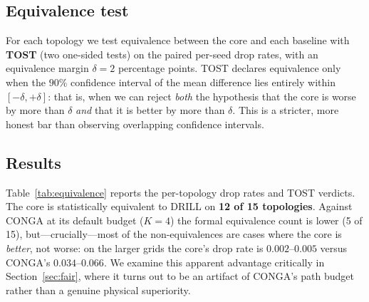 \subsection{Equivalence test}

For each topology we test equivalence between the core and each baseline with
\textbf{TOST} (two one-sided tests) on the paired per-seed drop rates, with an
equivalence margin $\delta = 2$ percentage points. TOST declares equivalence
only when the $90\%$ confidence interval of the mean difference lies entirely
within $[-\delta, +\delta]$: that is, when we can reject \emph{both} the
hypothesis that the core is worse by more than $\delta$ \emph{and} that it is
better by more than $\delta$. This is a stricter, more honest bar than
observing overlapping confidence intervals.

\subsection{Results}
\label{sec:equiv-results}

Table~\ref{tab:equivalence} reports the per-topology drop rates and TOST
verdicts. The core is statistically equivalent to DRILL on
\textbf{12 of 15 topologies}. Against CONGA at its default budget ($K=4$) the
formal equivalence count is lower (5 of 15), but---crucially---most of the
non-equivalences are cases where the core is \emph{better}, not worse: on the
larger grids the core's drop rate is $0.002$--$0.005$ versus CONGA's
$0.034$--$0.066$. We examine this apparent advantage critically in
Section~\ref{sec:fair}, where it turns out to be an artifact of CONGA's path
budget rather than a genuine physical superiority.

